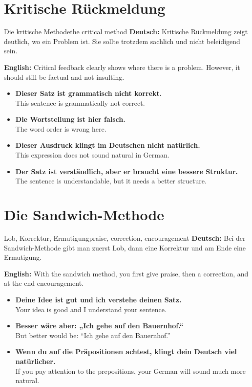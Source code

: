 \documentclass[a4paper,11pt]{article}
\newcommand{\GermanText}[1]{\textbf{Deutsch: }#1\par}
\newcommand{\EnglishText}[1]{{\small\color{SoftGray}\textbf{English: }#1\par}}
\newcommand{\ExampleItem}[2]{\item \textbf{#1}\\{\small\color{SoftGray}#2}}
\begin{document}
    
    \section{Kritische Rückmeldung}
        
        \begin{grammarentry}{Die kritische Methode}{the critical method}
            \GermanText{Kritische Rückmeldung zeigt deutlich, wo ein Problem ist. Sie sollte trotzdem sachlich und nicht beleidigend sein.}
            \EnglishText{Critical feedback clearly shows where there is a problem. However, it should still be factual and not insulting.}
            
            \begin{exbox}
                \begin{itemize}
                    \ExampleItem{Dieser Satz ist grammatisch nicht korrekt.}{This sentence is grammatically not correct.}
                    \ExampleItem{Die Wortstellung ist hier falsch.}{The word order is wrong here.}
                    \ExampleItem{Dieser Ausdruck klingt im Deutschen nicht natürlich.}{This expression does not sound natural in German.}
                    \ExampleItem{Der Satz ist verständlich, aber er braucht eine bessere Struktur.}{The sentence is understandable, but it needs a better structure.}
                \end{itemize}
            \end{exbox}
        \end{grammarentry}
    
    
    \section{Die Sandwich-Methode}
        
        \begin{grammarentry}{Lob, Korrektur, Ermutigung}{praise, correction, encouragement}
            \GermanText{Bei der Sandwich-Methode gibt man zuerst Lob, dann eine Korrektur und am Ende eine Ermutigung.}
            \EnglishText{With the sandwich method, you first give praise, then a correction, and at the end encouragement.}
            
            \begin{exbox}
                \begin{itemize}
                    \ExampleItem{Deine Idee ist gut und ich verstehe deinen Satz.}{Your idea is good and I understand your sentence.}
                    \ExampleItem{Besser wäre aber: „Ich gehe auf den Bauernhof.“}{But better would be: “Ich gehe auf den Bauernhof.”}
                    \ExampleItem{Wenn du auf die Präpositionen achtest, klingt dein Deutsch viel natürlicher.}{If you pay attention to the prepositions, your German will sound much more natural.}
                \end{itemize}
            \end{exbox}
        \end{grammarentry}
    
\end{document}
